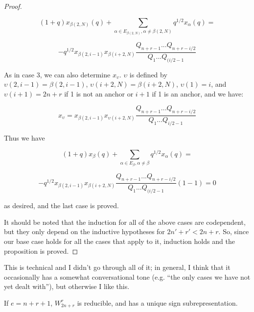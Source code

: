 \documentclass{amsart}
\begin{document}
\begin{proof}
\begin{enumerate}
	
	$$(1+q)x_{\beta(2,N)}(q)+\sum_{\alpha\in E_{\beta(2,N)},\alpha\not=\beta(2,N)}q^{1/2}x_{\alpha}(q)=$$
	
	$$-q^{1/2}x_{\beta(2,i-1)}x_{\beta(i+2,N)}\frac{Q_{n+r-1}...Q_{n+r-i/2}}{Q_1...Q_{(i/2-1}}$$
	
	As in case 3, we can also determine $x_\upsilon$. $\upsilon$ is defined by $\upsilon(2,i-1)=\beta(2,i-1)$, $\upsilon(i+2,N)=\beta(i+2,N)$, $\upsilon(1)=i$, and $\upsilon(i+1)=2n+r$ if 1 is not an anchor or $i+1$ if 1 is an anchor, and we have:
	
	$$x_\upsilon=x_{\beta(2,i-1)}x_{\upsilon(i+2,N)}\frac{Q_{n+r-1}...Q_{n+r-i/2}}{Q_1...Q_{i/2-1}}$$
	
	Thus we have
	
	$$(1+q)x_\beta(q)+\sum_{\alpha\in E_\beta,\alpha\not=\beta}q^{1/2}x_\alpha(q)=$$
	
	$$-q^{1/2}x_{\beta(2,i-1)}x_{\beta(i+2,N)}\frac{Q_{n+r-1}...Q_{n+r-i/2}}{Q_1...Q_{(i/2-1}}(1-1)=0$$
	
	as desired, and the last case is proved.
	\end{enumerate}

It should be noted that the induction for all of the above cases are codependent, but they only depend on the inductive hypotheses for $2n'+r'<2n+r$. So, since our base case holds for all the cases that apply to it, induction holds and the proposition is proved.

\end{proof}
{\color{magenta} This is technical and I didn't go through all of it;
in general, I think that it occasionally has a somewhat conversational tone (e.g. ``the only cases we have not yet dealt with''), but otherwise I like this.}

\begin{corollary}
	If $e=n+r+1$, $W_{2n+r}^r$ is reducible, and has a unique sign subrepresentation.
\end{corollary}
\end{document}
